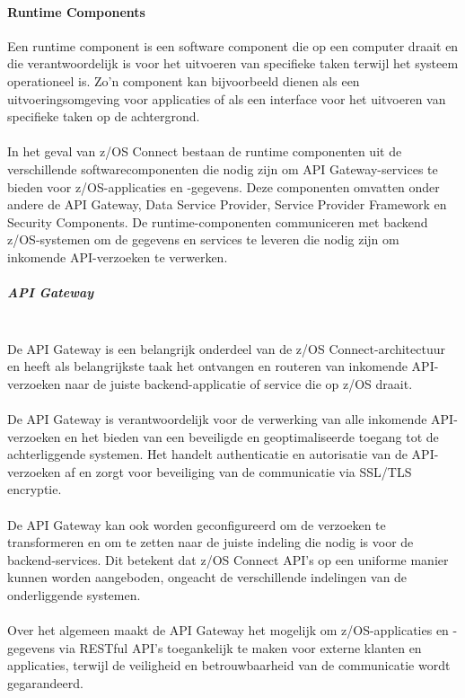 \paragraph{Runtime Components}
Een runtime component is een software component die op een computer draait en die verantwoordelijk is voor het uitvoeren van specifieke taken terwijl het systeem operationeel is. Zo'n component kan bijvoorbeeld dienen als een uitvoeringsomgeving voor applicaties of als een interface voor het uitvoeren van specifieke taken op de achtergrond. \autocite{IBM2023a}
\\ \\
In het geval van z/OS Connect bestaan de runtime componenten uit de verschillende softwarecomponenten die nodig zijn om API Gateway-services te bieden voor z/OS-applicaties en -gegevens. Deze componenten omvatten onder andere de API Gateway, Data Service Provider, Service Provider Framework en Security Components. De runtime-componenten communiceren met backend z/OS-systemen om de gegevens en services te leveren die nodig zijn om inkomende API-verzoeken te verwerken. \autocite{IBM2023a}
\\
\subparagraph{API Gateway} \mbox{} \\
De API Gateway is een belangrijk onderdeel van de z/OS Connect-architectuur en heeft als belangrijkste taak het ontvangen en routeren van inkomende API-verzoeken naar de juiste backend-applicatie of service die op z/OS draait. \autocite{IBM2023a}
\\ \\
De API Gateway is verantwoordelijk voor de verwerking van alle inkomende API-verzoeken en het bieden van een beveiligde en geoptimaliseerde toegang tot de achterliggende systemen. Het handelt authenticatie en autorisatie van de API-verzoeken af en zorgt voor beveiliging van de communicatie via SSL/TLS encryptie. \autocite{IBM2023a}
\\ \\
De API Gateway kan ook worden geconfigureerd om de verzoeken te transformeren en om te zetten naar de juiste indeling die nodig is voor de backend-services. Dit betekent dat z/OS Connect API's op een uniforme manier kunnen worden aangeboden, ongeacht de verschillende indelingen van de onderliggende systemen. \autocite{IBM2023a}
\\ \\
Over het algemeen maakt de API Gateway het mogelijk om z/OS-applicaties en -gegevens via RESTful API's toegankelijk te maken voor externe klanten en applicaties, terwijl de veiligheid en betrouwbaarheid van de communicatie wordt gegarandeerd. \autocite{IBM2023a}
